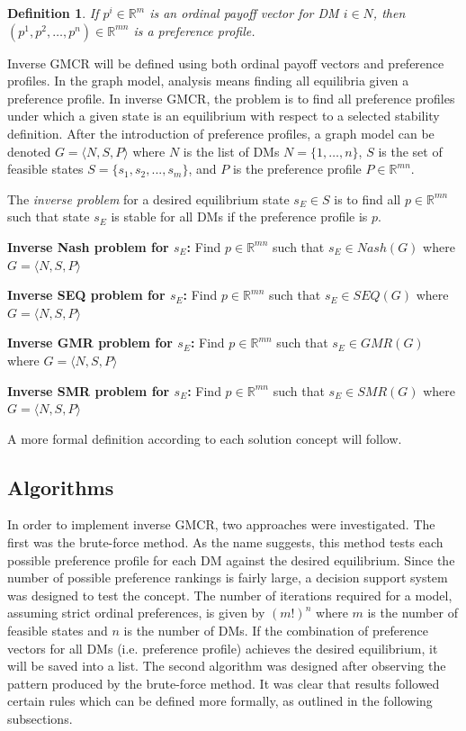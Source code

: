 \documentclass[letterpaper,12pt,titlepage,oneside,final]{book}
\newtheorem{definition}[lemma]{Definition}
\begin{document}
\begin{definition}
\rm
If $p^i \in \mathbb{R}^m$ is an ordinal payoff vector for DM $i \in N$, then $(p^1,p^2,\dots ,p^n) \in \mathbb{R}^{mn}$ is a preference profile.

\end{definition}


Inverse GMCR will be defined using both ordinal payoff vectors and preference profiles. In the graph model, analysis means finding all equilibria given a preference profile. In inverse GMCR, the problem is to find all preference profiles under which a given state is an equilibrium with respect to a selected stability definition.  After the introduction of preference profiles, a graph model can be denoted $G=\langle N,S,P\rangle$ where $N$ is the list of DMs $N=\{1,\dots ,n\}$, $S$ is the set of feasible states $S=\{s_1, s_2, ..., s_m\}$, and $P$ is the preference profile $P \in \mathbb{R}^{mn}$.


The \emph{inverse problem} for a desired equilibrium state $s_E \in S$ is to find all $p \in \mathbb{R}^{mn}$ such that state $s_E$ is stable for all DMs if the preference profile is $p$.


\noindent \textbf{Inverse Nash problem for $s_E$:} Find $p \in \mathbb{R}^{mn}$ such that $s_E \in Nash(G)$ where $G=\langle N,S,P\rangle $

\noindent \textbf{Inverse SEQ problem for $s_E$:} Find $p \in \mathbb{R}^{mn}$ such that $s_E \in SEQ(G)$ where $G=\langle N,S,P\rangle $

\noindent \textbf{Inverse GMR problem for $s_E$:} Find $p \in \mathbb{R}^{mn}$ such that $s_E \in GMR(G)$ where $G=\langle N,S,P\rangle $

\noindent \textbf{Inverse SMR problem for $s_E$:} Find $p \in \mathbb{R}^{mn}$ such that $s_E \in SMR(G)$ where $G=\langle N,S,P\rangle $

A more formal definition according to each solution concept will follow.


\subsection{Algorithms}

In order to implement inverse GMCR, two approaches were investigated. The first was the brute-force method. As the name suggests, this method tests each possible preference profile for each DM against the desired equilibrium. Since the number of possible preference rankings is fairly large, a decision support system was designed to test the concept. The number of iterations required for a model, assuming strict ordinal preferences, is given by $(m!)^{n}$ where $m$ is the number of feasible states and $n$ is the number of DMs.  If the combination of preference vectors for all DMs (i.e. preference profile) achieves the desired equilibrium, it will be saved into a list. The second algorithm was designed after observing the pattern produced by the brute-force method. It was clear that results followed certain rules which can be defined more formally, as outlined in the following subsections. %
\end{document}
